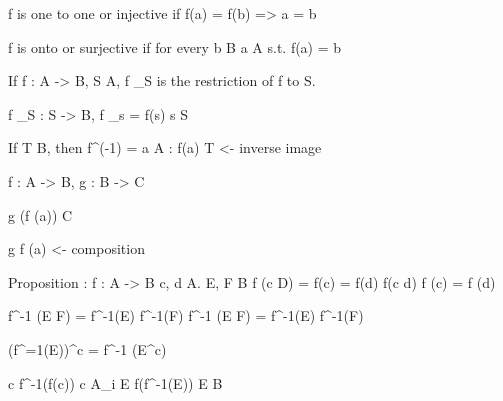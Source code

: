 f is one to one or injective if f(a) = f(b) => a = b 

f is onto or surjective if for every b \in B \exists a \in A s.t. f(a) = b 

If f : A -> B, S \subset A, f \big\vert_S is the restriction of f to S. 

f \big\vert_S : S -> B, f \big\vert_s = f(s) \forall s \in S 

If T \sub B, then f^(-1) = {a \in A : f(a) \in T} <- inverse image 

f : A -> B, g : B -> C 

g (f (a)) \in C 

g \circ f (a) <- composition

Proposition : f : A -> B 
c, d \in A. E, F \in B
f (c \cup D) = f(c) = f(d)
f(c \cap d) \sub f (c) = f (d) 

f^{-1} (E \cup F) = f^{-1}(E) \cup f^{-1}(F)
f^{-1} (E \cap F) = f^{-1}(E) \cap f^{-1}(F)

(f^{=1}(E))^c = f^{-1} (E^c)

c \sub f^{-1}(f(c))  c \sub A_i
E \cup f(f^-1(E)) E \sub B